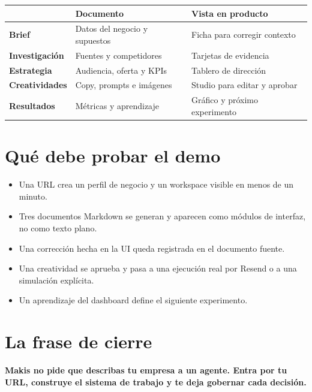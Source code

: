\documentclass{loopmind-doc}
\begin{document}
\vspace{6pt}
\begin{tabularx}{\textwidth}{>{\bfseries}p{31mm}X X}
\toprule
& \textbf{Documento} & \textbf{Vista en producto} \\
\midrule
Brief & Datos del negocio y supuestos & Ficha para corregir contexto \\
Investigación & Fuentes y competidores & Tarjetas de evidencia \\
Estrategia & Audiencia, oferta y KPIs & Tablero de dirección \\
Creatividades & Copy, prompts e imágenes & Studio para editar y aprobar \\
Resultados & Métricas y aprendizaje & Gráfico y próximo experimento \\
\bottomrule
\end{tabularx}

\section{Qué debe probar el demo}

\begin{callout}
\begin{itemize}
  \item Una URL crea un perfil de negocio y un workspace visible en menos de un minuto.
  \item Tres documentos Markdown se generan y aparecen como módulos de interfaz, no como texto plano.
  \item Una corrección hecha en la UI queda registrada en el documento fuente.
  \item Una creatividad se aprueba y pasa a una ejecución real por Resend o a una simulación explícita.
  \item Un aprendizaje del dashboard define el siguiente experimento.
\end{itemize}
\end{callout}

\section{La frase de cierre}

\begin{tcolorbox}[colback=lm-black,colframe=lm-black,arc=2mm,left=7mm,right=7mm,top=7mm,bottom=7mm]
{\headingfont\bfseries\fontsize{17pt}{23pt}\selectfont\color{white}
Makis no pide que describas tu empresa a un agente. Entra por tu URL, construye el sistema de trabajo y te deja gobernar cada decisión.}
\end{tcolorbox}
\end{document}
